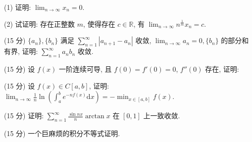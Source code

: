 (1) 证明: $\lim_{n\to \infty}x_n = 0.$\par
(2) 试证明: 存在正整数 $m$, 使得存在 $c \in \mathbb{R}$, 有 $\lim_{n \to \infty} n^{\frac{1}{m}} x_n = c$.\par
(15 分) $\{a_{n}\}, \{b_{n}\}$ 满足 $\sum_{n=1}^{\infty}|a_{n+1} - a_{n}|$ 收敛, $\lim_{n\to \infty}a_n = 0, \{b_n\}$ 的部分和有界, 证明: $\sum_{n=1}^{\infty}a_{n}b_{n}$ 收敛.\par
\par{}
(15 分) 设 $f(x)$ 一阶连续可导, 且 $f(0) = f'(0) = 0$, $f''(0)$ 存在, 证明:\par
\nopagebreak[4]
(15 分) 设 $f(x) \in C[a, b]$, 证明: $\lim_{n \to \infty} \frac{1}{n} \ln \left( \int_{a}^{b} e^{-nf(x)} \mathrm{d}x \right) = -\min_{x \in [a, b]} f(x)$.\par
(15 分) 证明: $\sum_{n=1}^{\infty} \frac{\sin nx}{n} \arctan x$ 在 $[0,1]$ 上一致收敛.\par
(15 分) 一个巨麻烦的积分不等式证明.\par
